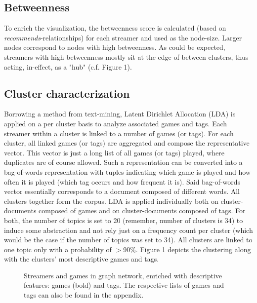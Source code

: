 \documentclass[11pt, oneside]{article}   	%
\begin{document}
\subsection{Betweenness}
To enrich the visualization, the betweenness score is calculated (based on \textit{recommends}-relationships) for each streamer and used as the node-size. Larger nodes correspond to nodes with high betweenness. As could be expected, streamers with high betweenness mostly sit at the edge of between clusters, thus acting, in-effect, as a "hub" (c.f. Figure 1).

\subsection{Cluster characterization}
Borrowing a method from text-mining, Latent Dirichlet Allocation (LDA) is applied on a per cluster basis to analyze associated games and tags.
\newline
Each streamer within a cluster is linked to a number of games (or tags). For each cluster, all linked games (or tags) are aggregated and compose the representative vector. This vector is just a long list of all games (or tags) played, where duplicates are of course allowed. Such a representation can be converted into a bag-of-words representation with tuples indicating which game is played and how often it is played (which tag occurs and how frequent it is). Said bag-of-words vector essentially corresponds to a document composed of different words. All clusters together form the corpus.
\newline
LDA is applied individually both on cluster-documents composed of games and on cluster-documents composed of tags. For both, the number of topics is set to 20 (remember, number of clusters is 34) to induce some abstraction and not rely just on a frequency count per cluster (which would be the case if the number of topics was set to 34).
\newline
All clusters are linked to one topic only with a probability of $>$90\%. Figure 1 depicts the clustering along with the clusters' most descriptive games and tags.


\begin{figure}
\centering
\caption{Streamers and games in graph network, enriched with descriptive features: games (bold) and tags. The respective lists of games and tags can also be found in the appendix.}
\label{figure label}
\end{figure}
\end{document}
